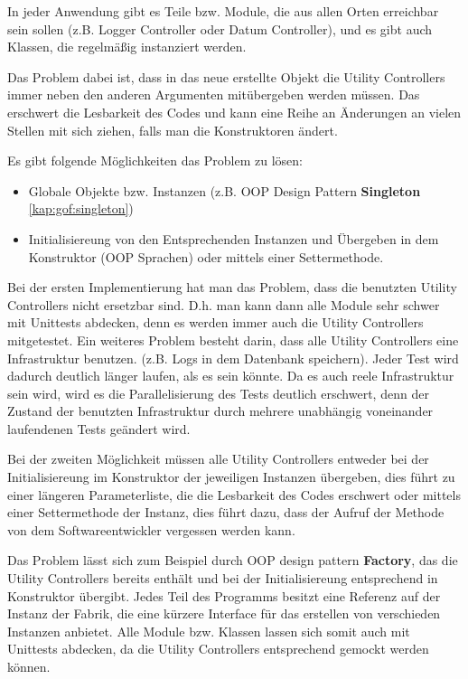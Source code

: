 In jeder Anwendung gibt es Teile bzw. Module, die aus allen Orten erreichbar sein sollen
(z.B. Logger Controller oder Datum Controller), und es gibt auch Klassen, die regelmäßig instanziert werden.

Das Problem dabei ist, dass in das neue erstellte Objekt die Utility Controllers immer neben den anderen Argumenten 
mitübergeben werden müssen. Das erschwert die Lesbarkeit des Codes und kann eine Reihe an Änderungen an vielen Stellen mit sich ziehen,
falls man die Konstruktoren ändert.

Es gibt folgende Möglichkeiten das Problem zu lösen:
\begin{itemize}
    \item Globale Objekte bzw. Instanzen (z.B. OOP Design Pattern \textbf{Singleton} \ref{kap:gof:singleton})
    \item Initialisiereung von den Entsprechenden Instanzen und Übergeben in dem Konstruktor (OOP Sprachen)
    oder mittels einer Settermethode.
\end{itemize}

Bei der ersten Implementierung hat man das Problem, dass die benutzten Utility Controllers nicht ersetzbar sind.
D.h. man kann dann alle Module sehr schwer mit Unittests abdecken, denn es werden immer auch die Utility Controllers mitgetestet.
Ein weiteres Problem besteht darin, dass alle Utility Controllers eine Infrastruktur benutzen.
(z.B. Logs in dem Datenbank speichern). Jeder Test wird dadurch deutlich länger laufen, als es sein könnte.
Da es auch reele Infrastruktur sein wird, wird es die Parallelisierung des Tests deutlich erschwert, denn 
der Zustand der benutzten Infrastruktur durch mehrere unabhängig voneinander laufendenen Tests geändert wird.

Bei der zweiten Möglichkeit müssen alle Utility Controllers entweder bei der Initialisiereung im Konstruktor 
der jeweiligen Instanzen übergeben, dies führt zu einer längeren Parameterliste,
die die Lesbarkeit des Codes erschwert oder mittels einer Settermethode der Instanz,
dies führt dazu, dass der Aufruf der Methode von dem Softwareentwickler vergessen werden kann.

Das Problem lässt sich zum Beispiel durch OOP design pattern \textbf{Factory}, das die Utility Controllers bereits
enthält und bei der Initialisiereung entsprechend in Konstruktor übergibt. 
Jedes Teil des Programms besitzt eine Referenz auf der Instanz der Fabrik, 
die eine kürzere Interface für das erstellen von verschieden Instanzen anbietet.
Alle Module bzw. Klassen lassen sich somit auch mit Unittests
abdecken, da die Utility Controllers entsprechend gemockt werden können. 

